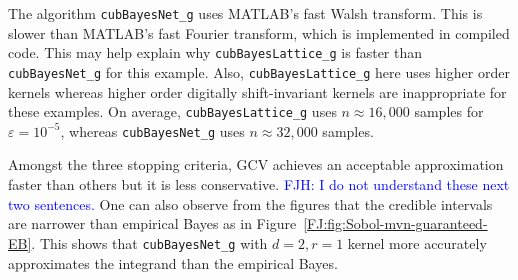 \documentclass[graybox,footinfo]{svmult}
\newcommand{\FJHNote}[1]{{\textcolor{blue}{FJH: #1}}}
\begin{document}
The algorithm \texttt{cubBayesNet\_g} uses MATLAB's fast Walsh transform.  This is slower than MATLAB's fast Fourier transform, which is implemented in compiled code. This may help explain why \texttt{cubBayesLattice\_g} is faster than \texttt{cubBayesNet\_g} for this example. Also, \texttt{cubBayesLattice\_g} here uses higher order kernels whereas higher order digitally shift-invariant kernels are inappropriate for these examples. On average, \texttt{cubBayesLattice\_g} uses $n \approx 16{,}000$ samples for $\varepsilon = 10^{-5}$, whereas \texttt{cubBayesNet\_g} uses  $n \approx 32{,}000$ samples.

Amongst the three stopping criteria, GCV achieves an acceptable approximation faster than others but it is less conservative. 
\FJHNote{I do not understand these next two sentences.} One can also observe from the figures that the credible intervals are narrower than empirical Bayes as in Figure~\ref{FJ:fig:Sobol-mvn-guaranteed-EB}.
This shows that \texttt{cubBayesNet\_g} with $d=2, r=1$ kernel more accurately approximates the integrand than the empirical Bayes.
\end{document}
